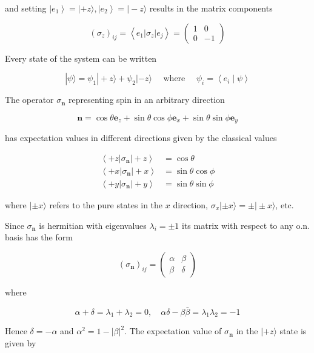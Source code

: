 \documentclass[10pt]{article}
\begin{document}
and setting $\left|e_{1}\right\rangle=|+z\rangle,\left|e_{2}\right\rangle=|-z\rangle$ results in the matrix components

$$
\left(\sigma_{z}\right)_{i j}=\left\langle e_{1}\left|\sigma_{z}\right| e_{j}\right\rangle=\left(\begin{array}{cc}
1 & 0 \\
0 & -1
\end{array}\right)
$$

Every state of the system can be written

$$
|\psi\rangle=\psi_{1}|+z\rangle+\psi_{2}|-z\rangle \quad \text { where } \quad \psi_{i}=\left\langle e_{i} \mid \psi\right\rangle
$$

The operator $\sigma_{\mathbf{n}}$ representing spin in an arbitrary direction

$$
\mathbf{n}=\cos \theta \mathbf{e}_{z}+\sin \theta \cos \phi \mathbf{e}_{x}+\sin \theta \sin \phi \mathbf{e}_{y}
$$

has expectation values in different directions given by the classical values

$$
\begin{aligned}
\left\langle+z\left|\sigma_{\mathbf{n}}\right|+z\right\rangle & =\cos \theta \\
\left\langle+x\left|\sigma_{\mathbf{n}}\right|+x\right\rangle & =\sin \theta \cos \phi \\
\left\langle+y\left|\sigma_{\mathbf{n}}\right|+y\right\rangle & =\sin \theta \sin \phi
\end{aligned}
$$

where $| \pm x\rangle$ refers to the pure states in the $x$ direction, $\sigma_{x}| \pm x\rangle= \pm| \pm x\rangle$, etc.

Since $\sigma_{\mathbf{n}}$ is hermitian with eigenvalues $\lambda_{i}= \pm 1$ its matrix with respect to any o.n. basis has the form

$$
\left(\sigma_{\mathbf{n}}\right)_{i j}=\left(\begin{array}{ll}
\alpha & \beta \\
\beta & \delta
\end{array}\right)
$$

where

$$
\alpha+\delta=\lambda_{1}+\lambda_{2}=0, \quad \alpha \delta-\beta \bar{\beta}=\lambda_{1} \lambda_{2}=-1
$$

Hence $\delta=-\alpha$ and $\alpha^{2}=1-|\beta|^{2}$. The expectation value of $\sigma_{\mathbf{n}}$ in the $|+z\rangle$ state is given by
\end{document}
